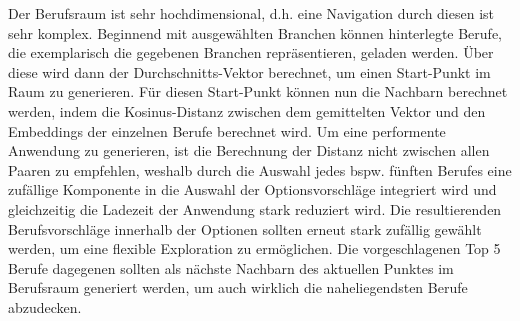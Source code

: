\documentclass[10pt]{article}
\begin{document}
Der Berufsraum ist sehr hochdimensional, d.h. eine Navigation durch diesen ist
sehr komplex. Beginnend mit ausgewählten Branchen können hinterlegte Berufe, die
exemplarisch die gegebenen Branchen repräsentieren, geladen werden. Über diese
wird dann der Durchschnitts-Vektor berechnet, um einen Start-Punkt im Raum zu
generieren. Für diesen Start-Punkt können nun die Nachbarn berechnet werden,
indem die Kosinus-Distanz zwischen dem gemittelten Vektor und den Embeddings der
einzelnen Berufe berechnet wird. Um eine performente Anwendung zu generieren,
ist die Berechnung der Distanz nicht zwischen allen Paaren zu empfehlen, weshalb
durch die Auswahl jedes bspw. fünften Berufes eine zufällige Komponente in die
Auswahl der Optionsvorschläge integriert wird und gleichzeitig die Ladezeit der
Anwendung stark reduziert wird. Die resultierenden Berufsvorschläge innerhalb
der Optionen sollten erneut stark zufällig gewählt werden, um eine flexible
Exploration zu ermöglichen. Die vorgeschlagenen Top 5 Berufe dagegenen sollten
als nächste Nachbarn des aktuellen Punktes im Berufsraum generiert werden, um
auch wirklich die naheliegendsten Berufe abzudecken.
\end{document}
